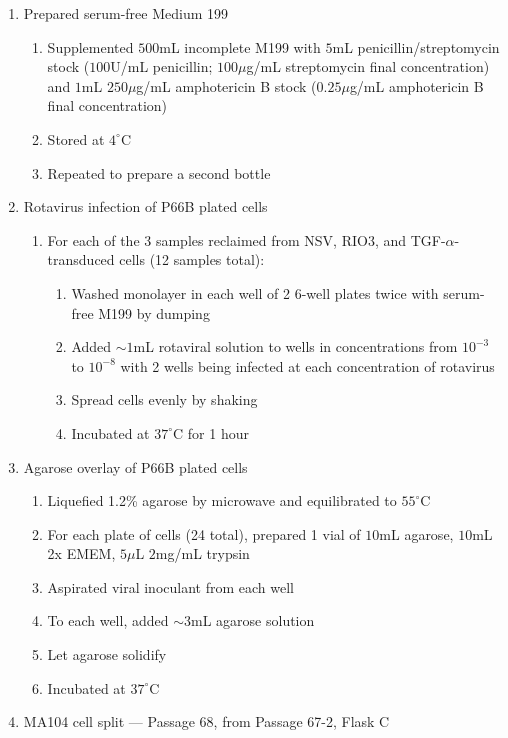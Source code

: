 \begin{enumerate}
	\item Prepared serum-free Medium 199
		\begin{enumerate}
			\item Supplemented $500$mL incomplete M199 with $5$mL penicillin/streptomycin stock ($100$U/mL penicillin; $100\mu$g/mL streptomycin final concentration) and $1$mL $250\mu$g/mL amphotericin B stock ($0.25\mu$g/mL amphotericin B final concentration)
			\item Stored at $4^{\circ}$C
			\item Repeated to prepare a second bottle
		\end{enumerate}
	\item Rotavirus infection of P66B plated cells
			\begin{enumerate}
				\item For each of the 3 samples reclaimed from NSV, RIO3, and TGF-$\alpha$-transduced cells (12 samples total):
					\begin{enumerate}
						\item Washed monolayer in each well of 2 6-well plates twice with serum-free M199 by dumping
						\item Added $\sim 1$mL rotaviral solution to wells in concentrations from $10^{-3}$ to $10^{-8}$ with 2 wells being infected at each concentration of rotavirus
						\item Spread cells evenly by shaking
						\item Incubated at $37^{\circ}$C for 1 hour
					\end{enumerate}
			\end{enumerate}
		\item Agarose overlay of P66B plated cells
			\begin{enumerate}
				\item Liquefied 1.2\% agarose by microwave and equilibrated to $55^{\circ}$C
				\item For each plate of cells (24 total), prepared 1 vial of $10$mL agarose, $10$mL 2x EMEM, $5\mu$L $2$mg/mL trypsin
				\item Aspirated viral inoculant from each well
				\item To each well, added $\sim3$mL agarose solution
				\item Let agarose solidify
				\item Incubated at $37^{\circ}$C
			\end{enumerate}
		\item MA104 cell split --- Passage 68, from Passage 67-2, Flask C

\end{enumerate}

